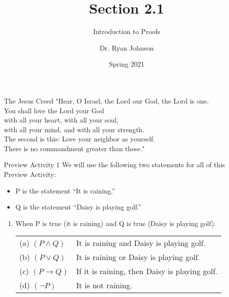 \documentclass{beamer}
\title{Section 2.1}
\subtitle{Introduction to Proofs}
\author{Dr. Ryan Johnson}
\institute{Grace College}
\date{Spring 2021}
\begin{document}
\begin{frame}[plain]
    \maketitle
\end{frame}

\begin{frame}{The Jesus Creed}
\Large{
"Hear, O Israel, the Lord our God, the Lord is one.\\
You shall love the Lord your God\\
\;\; with all your heart, with all your soul,\\
\;\; with all your mind, and with all your strength.\\
The second is this: Love your neighbor as yourself.\\
There is no commandment greater than these."
}
\end{frame}

\begin{frame}{Preview Activity 1}
	We will use the following two statements for all of this Preview Activity:
	\begin{itemize}
		\item P is the statement ``It is raining.''
		\item Q is the statement ``Daisy is playing golf.''
	\end{itemize}
	\begin{enumerate}
		\item When P is true (it is raining) and Q is true (Daisy is playing golf).\\[.1 in]
		\begin{tabular}{ll}
			(a) $(P \wedge Q)$ & It is raining and Daisy is playing golf.\\[.1 in]
			(b) $(P \vee Q)$ & It is raining or Daisy is playing golf.\\[.1 in]
			(c) $(P \to Q)$ & If it is raining, then Daisy is playing golf.\\[.1 in]
			(d) $(\neg P)$ & It is not raining.
		\end{tabular}
	\end{enumerate}
\end{frame}
\end{document}
